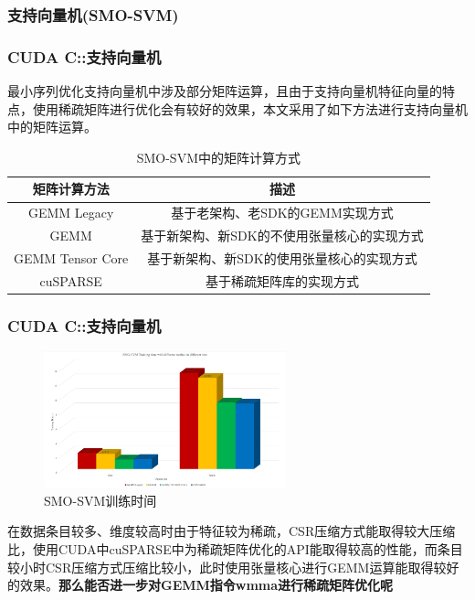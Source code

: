 \documentclass[10pt,aspectratio=169,mathserif]{beamer}
\begin{document}
	\subsubsection{支持向量机(SMO-SVM)}
	\begin{frame}
		\frametitle{CUDA C::支持向量机} 
		最小序列优化支持向量机中涉及部分矩阵运算，且由于支持向量机特征向量的特点，使用稀疏矩阵进行优化会有较好的效果，本文采用了如下方法进行支持向量机中的矩阵运算。
		\begin{table}
			\centering
			\caption{SMO-SVM中的矩阵计算方式}
			\begin{tabular}{cc}
				\toprule
				矩阵计算方法 & 描述	\\
				\midrule
				GEMM Legacy & 基于老架构、老SDK的GEMM实现方式\\
				GEMM & 基于新架构、新SDK的不使用张量核心的实现方式\\
				GEMM Tensor Core& 基于新架构、新SDK的使用张量核心的实现方式\\
				cuSPARSE & 基于稀疏矩阵库的实现方式\\
				\bottomrule
			\end{tabular} \label{table-SMOSVM} 
		\end{table}
	\end{frame}
	\begin{frame}
		\frametitle{CUDA C::支持向量机}
		\begin{figure}
			\centering
			\includegraphics[width=7cm]{figures/SMOSVMRES.jpg}
			\caption{SMO-SVM训练时间}\label{Fig.SMOSVM}
		\end{figure}
		在数据条目较多、维度较高时由于特征较为稀疏，CSR压缩方式能取得较大压缩比，使用CUDA中cuSPARSE中为稀疏矩阵优化的API能取得较高的性能，而条目较小时CSR压缩方式压缩比较小，此时使用张量核心进行GEMM运算能取得较好的效果。\textbf{那么能否进一步对GEMM指令wmma进行稀疏矩阵优化呢}
	\end{frame}

	
\end{document}
